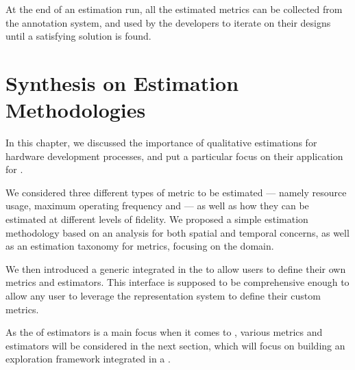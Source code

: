         At the end of an estimation run, all the estimated metrics can be collected from the annotation system, and used by the developers to iterate on their designs until a satisfying solution is found.


\clearpage
\section[Synthesis on the Estimation Methodologies]{Synthesis on Estimation Methodologies}
\label{ch.estimators:seq.synthesis}

    In this chapter, we discussed the importance of qualitative estimations for hardware development processes, and put a particular focus on their application for .

    We considered three different types of metric to be estimated --- namely resource usage, maximum operating frequency and  --- as well as how they can be estimated at different levels of fidelity.
    We proposed a simple estimation methodology based on an  analysis for both spatial and temporal concerns, as well as an estimation taxonomy for  metrics, focusing on the  domain.

    We then introduced a generic  integrated in the \chisel{}  to allow users to define their own metrics and estimators.
    This interface is supposed to be comprehensive enough to allow any user to leverage the \firrtl{} representation system to define their custom metrics.
    
    As the  of estimators is a main focus when it comes to , various metrics and estimators will be considered in the next section, which will focus on building an exploration framework integrated in a .

